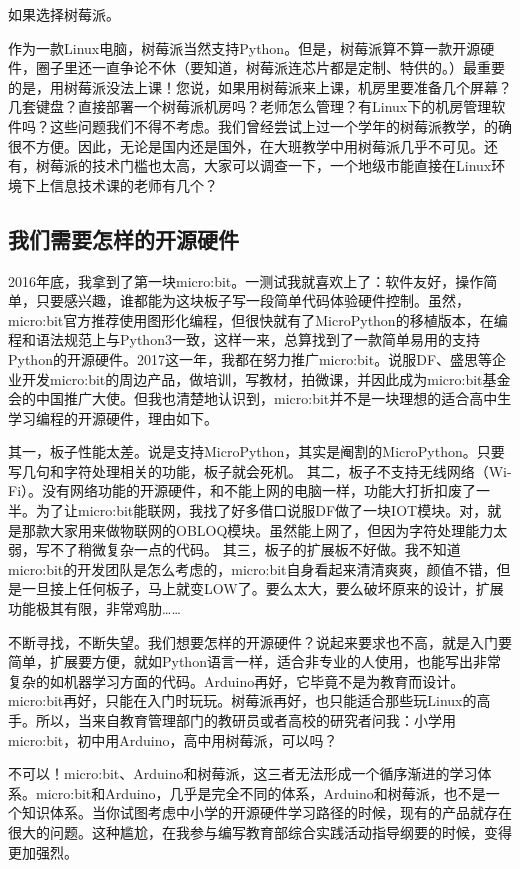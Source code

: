 \documentclass[letterpaper,10pt,english]{sphinxmanual}
\begin{document}
如果选择树莓派。

作为一款Linux电脑，树莓派当然支持Python。但是，树莓派算不算一款开源硬件，圈子里还一直争论不休（要知道，树莓派连芯片都是定制、特供的。）最重要的是，用树莓派没法上课！您说，如果用树莓派来上课，机房里要准备几个屏幕？几套键盘？直接部署一个树莓派机房吗？老师怎么管理？有Linux下的机房管理软件吗？这些问题我们不得不考虑。我们曾经尝试上过一个学年的树莓派教学，的确很不方便。因此，无论是国内还是国外，在大班教学中用树莓派几乎不可见。还有，树莓派的技术门槛也太高，大家可以调查一下，一个地级市能直接在Linux环境下上信息技术课的老师有几个？


\subsection{我们需要怎样的开源硬件}
\label{\detokenize{01.about/1.1-story:id3}}
2016年底，我拿到了第一块micro:bit。一测试我就喜欢上了：软件友好，操作简单，只要感兴趣，谁都能为这块板子写一段简单代码体验硬件控制。虽然，micro:bit官方推荐使用图形化编程，但很快就有了MicroPython的移植版本，在编程和语法规范上与Python3一致，这样一来，总算找到了一款简单易用的支持Python的开源硬件。2017这一年，我都在努力推广micro:bit。说服DF、盛思等企业开发micro:bit的周边产品，做培训，写教材，拍微课，并因此成为micro:bit基金会的中国推广大使。但我也清楚地认识到，micro:bit并不是一块理想的适合高中生学习编程的开源硬件，理由如下。

其一，板子性能太差。说是支持MicroPython，其实是阉割的MicroPython。只要写几句和字符处理相关的功能，板子就会死机。
其二，板子不支持无线网络（Wi-Fi）。没有网络功能的开源硬件，和不能上网的电脑一样，功能大打折扣废了一半。为了让micro:bit能联网，我找了好多借口说服DF做了一块IOT模块。对，就是那款大家用来做物联网的OBLOQ模块。虽然能上网了，但因为字符处理能力太弱，写不了稍微复杂一点的代码。
其三，板子的扩展板不好做。我不知道micro:bit的开发团队是怎么考虑的，micro:bit自身看起来清清爽爽，颜值不错，但是一旦接上任何板子，马上就变LOW了。要么太大，要么破坏原来的设计，扩展功能极其有限，非常鸡肋……

不断寻找，不断失望。我们想要怎样的开源硬件？说起来要求也不高，就是入门要简单，扩展要方便，就如Python语言一样，适合非专业的人使用，也能写出非常复杂的如机器学习方面的代码。Arduino再好，它毕竟不是为教育而设计。micro:bit再好，只能在入门时玩玩。树莓派再好，也只能适合那些玩Linux的高手。所以，当来自教育管理部门的教研员或者高校的研究者问我：小学用micro:bit，初中用Arduino，高中用树莓派，可以吗？

不可以！micro:bit、Arduino和树莓派，这三者无法形成一个循序渐进的学习体系。micro:bit和Arduino，几乎是完全不同的体系，Arduino和树莓派，也不是一个知识体系。当你试图考虑中小学的开源硬件学习路径的时候，现有的产品就存在很大的问题。这种尴尬，在我参与编写教育部综合实践活动指导纲要的时候，变得更加强烈。
\end{document}
